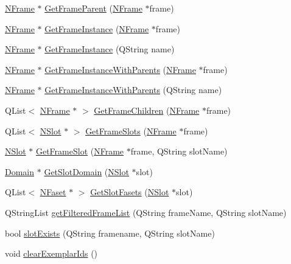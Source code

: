 \begin{DoxyCompactItemize}
\item 
\hyperlink{class_n_frame}{NFrame} $\ast$ \hyperlink{class_n_k_b_manager_a46dba5109cfd982728d68dbd899f4409}{GetFrameParent} (\hyperlink{class_n_frame}{NFrame} $\ast$frame)
\item 
\hyperlink{class_n_frame}{NFrame} $\ast$ \hyperlink{class_n_k_b_manager_abe311d6347a7184f68d47b7ad8f0834d}{GetFrameInstance} (\hyperlink{class_n_frame}{NFrame} $\ast$frame)
\item 
\hyperlink{class_n_frame}{NFrame} $\ast$ \hyperlink{class_n_k_b_manager_afc6e2c979f58e3aee34d94e968b8e923}{GetFrameInstance} (QString name)
\item 
\hyperlink{class_n_frame}{NFrame} $\ast$ \hyperlink{class_n_k_b_manager_a282ee71198ccb403ec86591b92201f16}{GetFrameInstanceWithParents} (\hyperlink{class_n_frame}{NFrame} $\ast$frame)
\item 
\hyperlink{class_n_frame}{NFrame} $\ast$ \hyperlink{class_n_k_b_manager_a54b48c7de9fd26e4c3f3e8279a8293c8}{GetFrameInstanceWithParents} (QString name)
\item 
QList$<$ \hyperlink{class_n_frame}{NFrame} $\ast$ $>$ \hyperlink{class_n_k_b_manager_a0f940967b82864cdd75f58be7a073557}{GetFrameChildren} (\hyperlink{class_n_frame}{NFrame} $\ast$frame)
\item 
QList$<$ \hyperlink{class_n_slot}{NSlot} $\ast$ $>$ \hyperlink{class_n_k_b_manager_acf7ba630945908e9b799bb0de6f3392d}{GetFrameSlots} (\hyperlink{class_n_frame}{NFrame} $\ast$frame)
\item 
\hyperlink{class_n_slot}{NSlot} $\ast$ \hyperlink{class_n_k_b_manager_ae278de7de7b8ab41f1cb62b555fd4cd8}{GetFrameSlot} (\hyperlink{class_n_frame}{NFrame} $\ast$frame, QString slotName)
\item 
\hyperlink{class_domain}{Domain} $\ast$ \hyperlink{class_n_k_b_manager_a63b38b5ae2a0250928d21ca3cebf8126}{GetSlotDomain} (\hyperlink{class_n_slot}{NSlot} $\ast$slot)
\item 
QList$<$ \hyperlink{class_n_faset}{NFaset} $\ast$ $>$ \hyperlink{class_n_k_b_manager_a9e268f966eceb8ec04a13a59914a7efa}{GetSlotFasets} (\hyperlink{class_n_slot}{NSlot} $\ast$slot)
\item 
QStringList \hyperlink{class_n_k_b_manager_aae254ff86b10aa51f92e2fd19f9cb997}{getFilteredFrameList} (QString frameName, QString slotName)
\item 
bool \hyperlink{class_n_k_b_manager_a1ac0bef1856c620db1dfd050e98bab9b}{slotExists} (QString framename, QString slotName)
\item 
void \hyperlink{class_n_k_b_manager_a772f462dfe2846f503246482ea8edc2a}{clearExemplarIds} ()
\end{DoxyCompactItemize}
